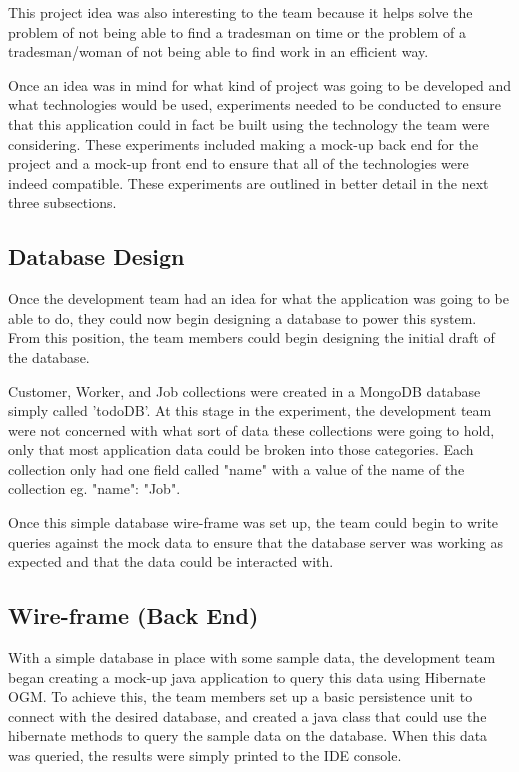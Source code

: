 This project idea was also interesting to the team because it helps solve the problem of not being able to find a tradesman on time or the problem of a tradesman/woman of not being able to find work in an efficient way. 

Once an idea was in mind for what kind of project was going to be developed and what technologies would be used, experiments needed to be conducted to ensure that this application could in fact be built using the technology the team were considering. These experiments included making a mock-up back end for the project and a mock-up front end to ensure that all of the technologies were indeed compatible. These experiments are outlined in better detail in the next three subsections. 

\subsection{Database Design}
\label{sec:MethodologyDatabaseDesign}
Once the development team had an idea for what the application was going to be able to do, they could now begin designing a database to power this system. From this position, the team members could begin designing the initial draft of the database. 

\bigskip

Customer, Worker, and Job collections were created in a MongoDB database simply called 'todoDB'. At this stage in the experiment, the development team were not concerned with what sort of data these collections were going to hold, only that most application data could be broken into those categories. Each collection only had one field called "name" with a value of the name of the collection eg. "name": "Job".

\bigskip

Once this simple database wire-frame was set up, the team could begin to write queries against the mock data to ensure that the database server was working as expected and that the data could be interacted with. 


\subsection{Wire-frame (Back End)}
\label{sec:MethodologyWireFrame1}
With a simple database in place with some sample data, the development team began creating a mock-up java application to query this data using Hibernate OGM. To achieve this, the team members set up a basic persistence unit to connect with the desired database, and created a java class that could use the hibernate methods to query the sample data on the database. When this data was queried, the results were simply printed to the IDE console. 

